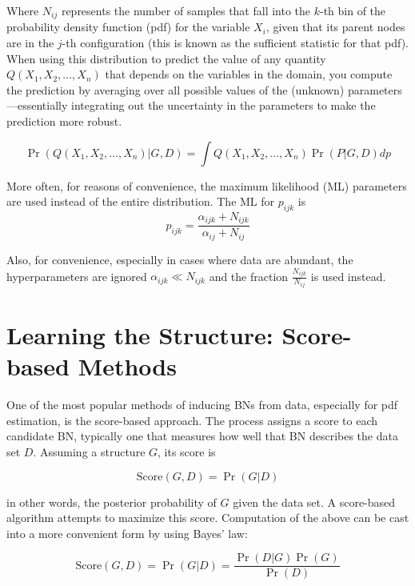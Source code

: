 Where \( N_{ij} \) represents the number of samples that fall into the \(k\)-th bin of the probability density function (pdf) for the variable \( X_i \), given that its parent nodes are in the \(j\)-th configuration (this is known as the sufficient statistic for that pdf). When using this distribution to predict the value of any quantity \( Q(X_1,X_2,\dots,X_n) \) that depends on the variables in the domain, you compute the prediction by averaging over all possible values of the (unknown) parameters—essentially integrating out the uncertainty in the parameters to make the prediction more robust.

\begin{equation}
\Pr(Q(X_1,X_2,\dots,X_n) | G,D) = \int Q(X_1,X_2,\dots,X_n) \Pr(P | G,D) dp
\end{equation}

More often, for reasons of convenience, the maximum likelihood (ML) parameters are used instead of the entire distribution. The ML for \( p_{ijk} \) is 
\begin{equation}
p_{ijk} = \frac{\alpha_{ijk} + N_{ijk}}{\alpha_{ij} + N_{ij}}
\end{equation}

Also, for convenience, especially in cases where data are abundant, the hyperparameters are ignored \( \alpha_{ijk} \ll N_{ijk} \) and the fraction \( \frac{N_{ijk}}{N_{ij}} \) is used instead. 

\section*{Learning the Structure: Score-based Methods}

One of the most popular methods of inducing BNs from data, especially for pdf estimation, is the score-based approach. The process assigns a score to each candidate BN, typically one that measures how well that BN describes the data set \( D \). Assuming a structure \( G \), its score is

\[
\text{Score}(G,D) = \Pr(G | D)
\]

in other words, the posterior probability of \( G \) given the data set. A score-based algorithm attempts to maximize this score. Computation of the above can be cast into a more convenient form by using Bayes’ law:

\begin{equation}
\text{Score}(G,D) = \Pr(G | D) = \frac{\Pr(D | G) \Pr(G)}{\Pr(D)}  
\end{equation}

